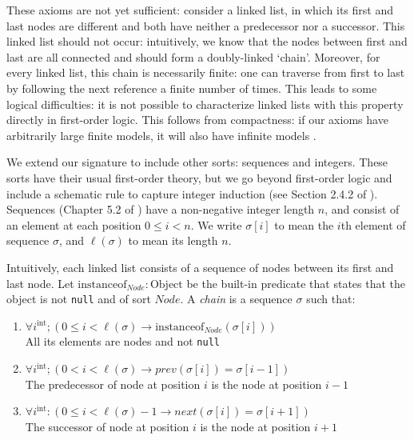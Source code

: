 \documentclass[runningheads]{llncs}
\begin{document}
These axioms are not yet sufficient: consider a linked list, in which its first and last nodes are different and both have neither a predecessor nor a successor. This linked list should not occur: intuitively, we know that the nodes between first and last are all connected and should form a doubly-linked `chain'. Moreover, for every linked list, this chain is necessarily finite: one can traverse from first to last by following the next reference a finite number of times. This leads to some logical difficulties: it is not possible to characterize linked lists with this property directly in first-order logic. This follows from compactness: if our axioms have arbitrarily large finite models, it will also have infinite models \cite{benthem2001hol}.

We extend our signature to include other sorts: sequences and integers. These sorts have their usual first-order theory, but we go beyond first-order logic and include a schematic rule to capture integer induction (see Section 2.4.2 of \cite{KeYbook}). Sequences (Chapter 5.2 of \cite{KeYbook}) have a non-negative integer length $n$, and consist of an element at each position $0\leq i<n$. We write $\sigma[i]$ to mean the $i$th element of sequence $\sigma$, and $\ell(\sigma)$ to mean its length $n$.

Intuitively, each linked list consists of a sequence of nodes between its first and last node. Let $\mathrm{instanceof}_\mathit{Node}: \mathrm{Object}$ be the built-in predicate that states that the object is not \texttt{null} and of sort $\mathit{Node}$. A \emph{chain} is a sequence $\sigma$ such that:

\begin{enumerate}[label=(\alph*)]
    \item $\forall i^\mathrm{int}; (0\leq i<\ell(\sigma)\to \mathrm{instanceof}_\mathit{Node}(\sigma[i]))$\\
    All its elements are nodes and not \texttt{null}
    \item\label{item:prev} $\forall i^\mathrm{int}; (0<i<\ell(\sigma)\to \mathit{prev}(\sigma[i]) = \sigma[i-1])$\\
    The predecessor of node at position $i$ is the node at position $i-1$
    \item\label{item:next} $\forall i^\mathrm{int}: (0\leq i<\ell(\sigma)-1\to \mathit{next}(\sigma[i]) = \sigma[i+1])$\\
    The successor of node at position $i$ is the node at position $i+1$
\end{enumerate}
\end{document}
